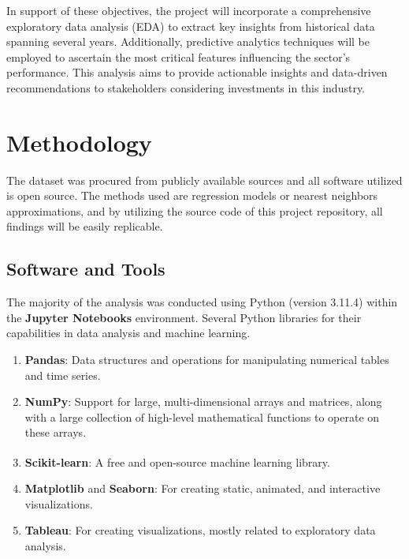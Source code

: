 \documentclass{article}
\theoremstyle{mytheoremstyle}
\theoremstyle{mytheoremstyle}
\theoremstyle{myproblemstyle}
\begin{document}
In support of these objectives, the project will incorporate a comprehensive exploratory data analysis (EDA) to extract key insights from historical data spanning several years. Additionally, predictive analytics techniques will be employed to ascertain the most critical features influencing the sector’s performance. This analysis aims to provide actionable insights and data-driven recommendations to stakeholders considering investments in this industry.

\pagebreak
\section{Methodology}

The dataset was procured from publicly available sources and all software utilized is open source. The methods used are regression models or nearest neighbors approximations, and by utilizing the source code of this project repository, all findings will be easily replicable.

\subsection{Software and Tools}

The majority of the analysis was conducted using Python (version 3.11.4) within the \textbf{Jupyter Notebooks} environment. Several Python libraries for their capabilities in data analysis and machine learning. 

\begin{enumerate}
    \item \textbf{Pandas}: Data structures and operations for manipulating numerical tables and time series.
    \item \textbf{NumPy}: Support for large, multi-dimensional arrays and matrices, along with a large collection of high-level mathematical functions to operate on these arrays.
    \item \textbf{Scikit-learn}: A free and open-source machine learning library.\textsuperscript{\cite{sklearn}} 
    \item \textbf{Matplotlib} and \textbf{Seaborn}: For creating static, animated, and interactive visualizations.
    \item \textbf{Tableau}: For creating visualizations, mostly related to exploratory data analysis.
\end{enumerate}
\end{document}
